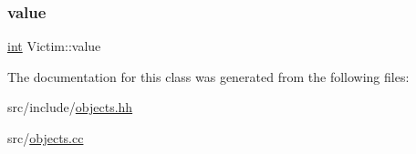 \subsubsection{\texorpdfstring{value}{value}}
{\footnotesize\ttfamily \mbox{\hyperlink{draw_8hh_aa620a13339ac3a1177c86edc549fda9b}{int}} Victim\+::value\hspace{0.3cm}{\ttfamily [protected]}}



The documentation for this class was generated from the following files\+:\begin{DoxyCompactItemize}
\item 
src/include/\mbox{\hyperlink{objects_8hh}{objects.\+hh}}\item 
src/\mbox{\hyperlink{objects_8cc}{objects.\+cc}}\end{DoxyCompactItemize}
